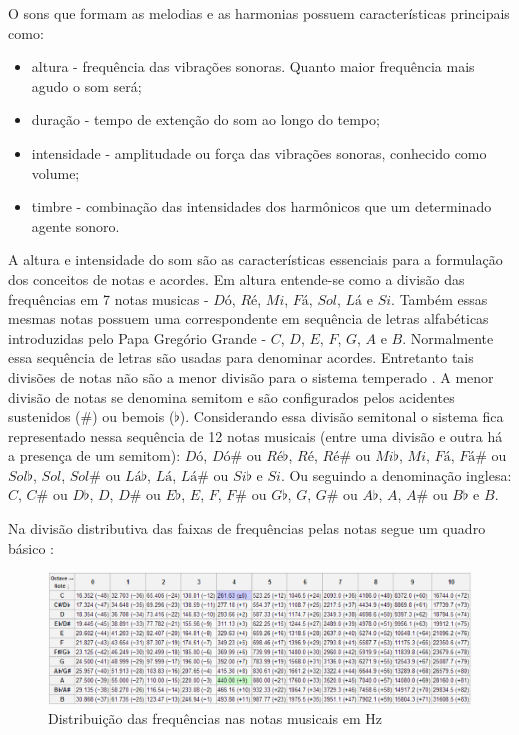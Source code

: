O sons que formam as melodias e as harmonias possuem características principais como:
\begin{itemize}
	\item altura - frequência das vibrações sonoras. Quanto maior frequência mais agudo o som será;
	\item duração - tempo de extenção do som ao longo do tempo;
	\item intensidade - amplitudade ou força das vibrações sonoras, conhecido como volume;
	\item timbre - combinação das intensidades dos harmônicos que um determinado agente sonoro.
\end{itemize}

A altura e intensidade do som são as características essenciais para a formulação dos conceitos de notas e acordes. Em altura entende-se como a divisão das frequências em 7 notas musicas - $Dó$, $Ré$, $Mi$, $Fá$, $Sol$, $Lá$ e $Si$. Também essas mesmas notas possuem uma correspondente em sequência de letras alfabéticas introduzidas pelo Papa Gregório Grande - $C$, $D$, $E$, $F$, $G$, $A$ e $B$. Normalmente essa sequência de letras são usadas para denominar acordes. Entretanto tais divisões de notas não são a menor divisão para o sistema temperado \cite{med1996teoria}. A menor divisão de notas se denomina semitom e são configurados pelos acidentes sustenidos ($\#$) ou bemois ($\flat$). Considerando essa divisão semitonal o sistema fica representado nessa sequência de 12 notas musicais (entre uma divisão e outra há a presença de um semitom): $Dó$, $Dó\#$ ou $Ré\flat$, $Ré$, $Ré\#$ ou $Mi\flat$, $Mi$, $Fá$, $Fá\#$ ou $Sol\flat$, $Sol$, $Sol\#$ ou $Lá\flat$, $Lá$, $Lá\#$ ou $Si\flat$ e $Si$. Ou seguindo a denominação inglesa: $C$, $C\#$ ou $D\flat$, $D$, $D\#$ ou $E\flat$, $E$, $F$, $F\#$ ou $G\flat$, $G$, $G\#$ ou $A\flat$, $A$, $A\#$ ou $B\flat$ e $B$.

\newpage
Na divisão distributiva das faixas de frequências pelas notas segue um quadro básico \cite{notasfreq}: 
\begin{figure}[h]
	\centering
		\includegraphics[scale=0.6]{figuras/NOTASpt.eps}
	\caption{Distribuição das frequências nas notas musicais em Hz}
\end{figure}    

